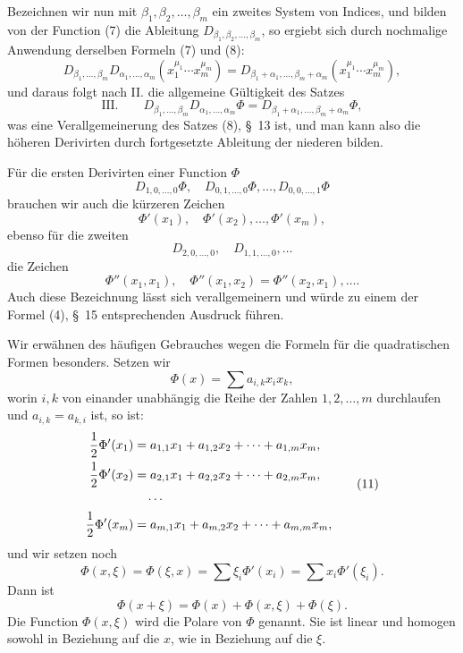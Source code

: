 \documentclass[11pt]{article}
\begin{document}
Bezeichnen wir nun mit $\beta_1,\beta_2,\ldots,\beta_m$ ein zweites System von Indices, und bilden von der Function (7) die Ableitung $D_{\beta_1,\beta_2,\ldots,\beta_m}$, so ergiebt sich durch nochmalige Anwendung derselben Formeln (7) und (8):
\begin{equation}
 D_{\beta_1,\ldots,\beta_m}D_{\alpha_1,\ldots,\alpha_m}
 (x_1^{\mu_1}\cdots x_m^{\mu_m})
 =
 D_{\beta_1+\alpha_1,\ldots,\beta_m+\alpha_m}
 (x_1^{\mu_1}\cdots x_m^{\mu_m}),
\tag{9}
\end{equation}
und daraus folgt nach II. die allgemeine Gültigkeit des Satzes
\[
\text{III.}\qquad
D_{\beta_1,\ldots,\beta_m}D_{\alpha_1,\ldots,\alpha_m}\Phi
 =
D_{\beta_1+\alpha_1,\ldots,\beta_m+\alpha_m}\Phi,
\]
was eine Verallgemeinerung des Satzes (8), \S~13 ist, und man kann also die höheren Derivirten durch fortgesetzte Ableitung der niederen bilden.

Für die ersten Derivirten einer Function $\Phi$
\[
D_{1,0,\ldots,0}\Phi,\quad D_{0,1,\ldots,0}\Phi,\ldots,D_{0,0,\ldots,1}\Phi
\]
brauchen wir auch die kürzeren Zeichen
\[
\Phi'(x_1),\quad \Phi'(x_2),\ldots,\Phi'(x_m),
\]
ebenso für die zweiten
\[
D_{2,0,\ldots,0},\quad D_{1,1,\ldots,0},\ldots
\]
die Zeichen
\[
\Phi''(x_1,x_1),\quad \Phi''(x_1,x_2)=\Phi''(x_2,x_1),\ldots.
\]
Auch diese Bezeichnung lässt sich verallgemeinern und würde zu einem der Formel (4), \S~15 entsprechenden Ausdruck führen.

Wir erwähnen des häufigen Gebrauches wegen die Formeln für die quadratischen Formen besonders. Setzen wir
\begin{equation}
 \Phi(x)=\sum a_{i,k}x_i x_k,
\tag{10}
\end{equation}
worin $i,k$ von einander unabhängig die Reihe der Zahlen $1,2,\ldots,m$ durchlaufen und $a_{i,k}=a_{k,i}$ ist, so ist:
\begin{equation}
\begin{aligned}
 {1\over2}\Phi'(x_1)&=a_{1,1}x_1+a_{1,2}x_2+\cdots+a_{1,m}x_m,\\
 {1\over2}\Phi'(x_2)&=a_{2,1}x_1+a_{2,2}x_2+\cdots+a_{2,m}x_m,\\
 &\quad\cdots\\
 {1\over2}\Phi'(x_m)&=a_{m,1}x_1+a_{m,2}x_2+\cdots+a_{m,m}x_m,
\end{aligned}
\tag{11}
\end{equation}
und wir setzen noch
\begin{equation}
 \Phi(x,\xi)=\Phi(\xi,x)=\sum \xi_i\Phi'(x_i)=\sum x_i\Phi'(\xi_i).
\tag{12}
\end{equation}
Dann ist
\begin{equation}
 \Phi(x+\xi)=\Phi(x)+\Phi(x,\xi)+\Phi(\xi).
\tag{13}
\end{equation}
Die Function $\Phi(x,\xi)$ wird die Polare von $\Phi$ genannt. Sie ist linear und homogen sowohl in Beziehung auf die $x$, wie in Beziehung auf die $\xi$.
\end{document}
